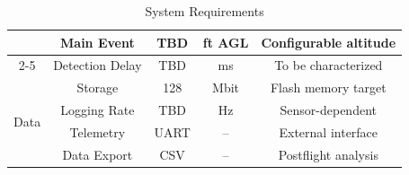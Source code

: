 \begin{table}[H]
\begin{tabular}{ccccc}
        & Main Event
        & TBD
        & ft AGL
        & Configurable altitude \\
    \cmidrule(lr){2-5}

        & Detection Delay
        & TBD
        & ms
        & To be characterized \\
    \midrule


    \multirow{4}{*}{Data}
        & Storage
        & 128
        & Mbit
        & Flash memory target \\
    \cmidrule(lr){2-5}

        & Logging Rate
        & TBD
        & Hz
        & Sensor-dependent \\
    \cmidrule(lr){2-5}

        & Telemetry
        & UART
        & --
        & External interface \\
    \cmidrule(lr){2-5}

        & Data Export
        & CSV
        & --
        & Postflight analysis \\

    \bottomrule
    \end{tabular}
    \vspace{3mm}
    \caption{\comet{} System Requirements}
    \label{tab:COMET_Requirements_Table}
\end{table}




